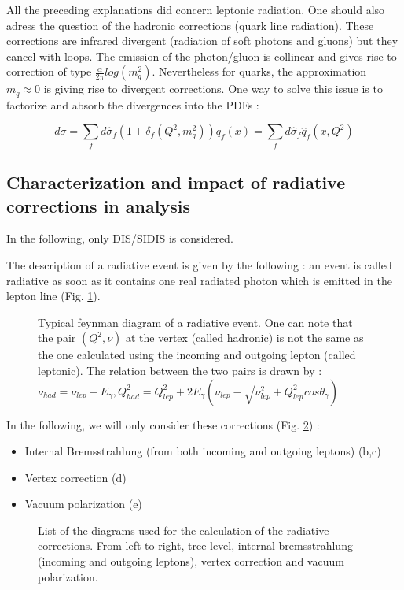 All the preceding explanations did concern leptonic radiation. One should also adress the question of
the hadronic corrections (quark line radiation). These corrections are infrared divergent (radiation of soft photons and gluons)
but they cancel with loops. The emission of the photon/gluon is collinear and gives rise to correction of
type $\frac{\alpha}{2\pi}log(m_{q}^{2})$. Nevertheless for quarks, the approximation $m_{q} \approx 0$ is
giving rise to divergent corrections. One way to solve this issue is to factorize and absorb the divergences
into the PDFs :

\[d\sigma = \sum_{f}d\hat{\sigma}_{f}(1+\delta_{f}(Q^{2},m^{2}_{q}))q_{f}(x) = \sum_{f}d\hat{\sigma}_{f}\hat{q}_{f}(x,Q^{2})\]

\subsection{Characterization and impact of radiative corrections in analysis}

In the following, only DIS/SIDIS is considered.

The description of a radiative event is given by the following : an event is called radiative as soon as it
contains one real radiated photon which is emitted in the lepton line (Fig. \ref{fig:rad_evt}).

\begin{figure}[htb]
\centerline{}
\caption{Typical feynman diagram of a radiative event. One can note that the pair $(Q^2,\nu)$ at the vertex (called hadronic)
is not the same as the one calculated using the incoming and outgoing lepton (called leptonic). The relation between the two pairs
is drawn by :
$\nu_{had} = \nu_{lep} - E_\gamma, Q^2_{had}=Q^2_{lep}+2E_\gamma(\nu_{lep}-\sqrt{\nu_{lep}^2+Q^2_{lep}}cos\theta_\gamma)$}
\label{fig:rad_evt}
\end{figure}


In the following, we will only consider these corrections (Fig. \ref{fig:rad_dia}) :
\begin{itemize}
\item Internal Bremsstrahlung (from both incoming and outgoing leptons) (b,c)
\item Vertex correction (d)
\item Vacuum polarization (e)
\end{itemize}

\begin{figure}[htb]
\centerline{}
\caption{List of the diagrams used for the calculation of the radiative corrections. From left to right,
tree level, internal bremsstrahlung (incoming and outgoing leptons), vertex correction and vacuum polarization.}\label{fig:rad_dia}
\end{figure}

